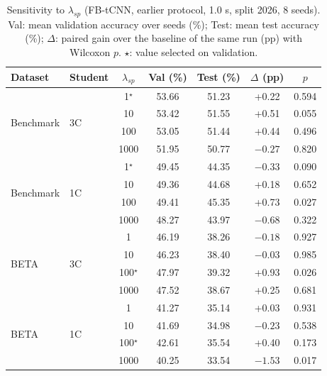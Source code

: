 \documentclass[10pt]{article} %
\begin{document}
\begin{table}[h]
\caption{Sensitivity to $\lambda_{sp}$ (FB-tCNN, earlier protocol, 1.0 s, split 2026, 8 seeds). Val: mean validation accuracy over seeds (\%); Test: mean test accuracy (\%); $\Delta$: paired gain over the baseline of the same run (pp) with Wilcoxon $p$. $\star$: value selected on validation.}
\label{tab:lambda_val}
\begin{center}
\footnotesize
\begin{tabular}{llccccc}
\toprule
Dataset & Student & $\lambda_{sp}$ & Val (\%) & Test (\%) & $\Delta$ (pp) & $p$ \\
\midrule
\multirow{4}{*}{Benchmark} & \multirow{4}{*}{3C} & 1$^\star$ & 53.66 & 51.23 & +0.22 & 0.594 \\
 & & 10 & 53.42 & 51.55 & +0.51 & 0.055 \\
 & & 100 & 53.05 & 51.44 & +0.44 & 0.496 \\
 & & 1000 & 51.95 & 50.77 & $-0.27$ & 0.820 \\
\midrule
\multirow{4}{*}{Benchmark} & \multirow{4}{*}{1C} & 1$^\star$ & 49.45 & 44.35 & $-0.33$ & 0.090 \\
 & & 10 & 49.36 & 44.68 & +0.18 & 0.652 \\
 & & 100 & 49.41 & 45.35 & +0.73 & 0.027 \\
 & & 1000 & 48.27 & 43.97 & $-0.68$ & 0.322 \\
\midrule
\multirow{4}{*}{BETA} & \multirow{4}{*}{3C} & 1 & 46.19 & 38.26 & $-0.18$ & 0.927 \\
 & & 10 & 46.23 & 38.40 & $-0.03$ & 0.985 \\
 & & 100$^\star$ & 47.97 & 39.32 & +0.93 & 0.026 \\
 & & 1000 & 47.52 & 38.67 & +0.25 & 0.681 \\
\midrule
\multirow{4}{*}{BETA} & \multirow{4}{*}{1C} & 1 & 41.27 & 35.14 & +0.03 & 0.931 \\
 & & 10 & 41.69 & 34.98 & $-0.23$ & 0.538 \\
 & & 100$^\star$ & 42.61 & 35.54 & +0.40 & 0.173 \\
 & & 1000 & 40.25 & 33.54 & $-1.53$ & 0.017 \\
\bottomrule
\end{tabular}
\end{center}
\end{table}
\end{document}
